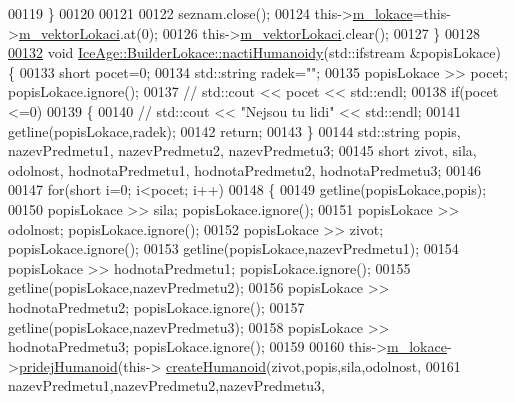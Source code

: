 \begin{DoxyCode}
00119     \}
00120 
00121 
00122     seznam.close(); 
00124     this->\hyperlink{classIceAge_1_1BuilderLokace_aad0fb17bf38c03cd767e100758348f24}{m\_lokace}=this->\hyperlink{classIceAge_1_1BuilderLokace_a110ada142d159f68fb82382a47d088f4}{m\_vektorLokaci}.at(0); 
00126     this->\hyperlink{classIceAge_1_1BuilderLokace_a110ada142d159f68fb82382a47d088f4}{m\_vektorLokaci}.clear();
00127 \}
00128 
\hypertarget{BuilderLokace_8cpp_source.tex_l00132}{}\hyperlink{classIceAge_1_1BuilderLokace_a98fae825f3de1d12408a85f03d98f2fd}{00132} \textcolor{keywordtype}{void} \hyperlink{classIceAge_1_1BuilderLokace_a98fae825f3de1d12408a85f03d98f2fd}{IceAge::BuilderLokace::nactiHumanoidy}(std::ifstream &popisLokace)
      \{
00133     \textcolor{keywordtype}{short} pocet=0; 
00134     std::string radek=\textcolor{stringliteral}{""};
00135     popisLokace >> pocet;           popisLokace.ignore(); 
00137 \textcolor{comment}{//    std::cout << pocet << std::endl;}
00138     \textcolor{keywordflow}{if}(pocet <=0) 
00139     \{
00140 \textcolor{comment}{//        std::cout << "Nejsou tu lidi" << std::endl;}
00141         getline(popisLokace,radek);
00142         \textcolor{keywordflow}{return};
00143     \}
00144     std::string popis, nazevPredmetu1, nazevPredmetu2, nazevPredmetu3; 
00145     \textcolor{keywordtype}{short} zivot, sila, odolnost, hodnotaPredmetu1, hodnotaPredmetu2, hodnotaPredmetu3;
00146 
00147     \textcolor{keywordflow}{for}(\textcolor{keywordtype}{short} i=0; i<pocet; i++) 
00148     \{
00149         getline(popisLokace,popis);
00150         popisLokace >> sila;                        popisLokace.ignore();
00151         popisLokace >> odolnost;                    popisLokace.ignore();
00152         popisLokace >> zivot;                       popisLokace.ignore();
00153         getline(popisLokace,nazevPredmetu1);
00154         popisLokace >> hodnotaPredmetu1;            popisLokace.ignore();
00155         getline(popisLokace,nazevPredmetu2);
00156         popisLokace >> hodnotaPredmetu2;            popisLokace.ignore();
00157         getline(popisLokace,nazevPredmetu3);
00158         popisLokace >> hodnotaPredmetu3;            popisLokace.ignore();
00159 
00160         this->\hyperlink{classIceAge_1_1BuilderLokace_aad0fb17bf38c03cd767e100758348f24}{m\_lokace}->\hyperlink{classIceAge_1_1Lokace_ab8da7a4fa629d827d0b633c67d65da4e}{pridejHumanoid}(this->
      \hyperlink{classIceAge_1_1BuilderLokace_abff6ab9c1d0218adfe423f45c8186090}{createHumanoid}(zivot,popis,sila,odolnost,
00161                                                     nazevPredmetu1,nazevPredmetu2,nazevPredmetu3,

\end{DoxyCode}
